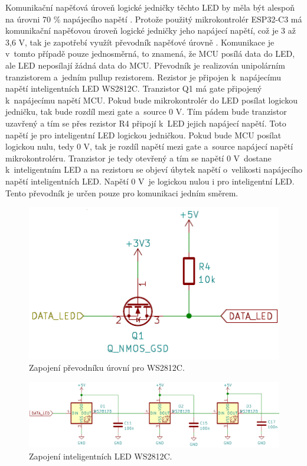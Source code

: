 Komunikační napěťová úroveň logické jedničky těchto LED by měla být alespoň na úrovni 70 \% napájecího napětí \cite{WS2812C_dtsh}. 
Protože použitý mikrokontrolér ESP32-C3 má komunikační napěťovou úroveň logické jedničky jeho napájecí napětí, což je 3 až 3,6 V, 
tak je zapotřebí využít převodník napěťové úrovně \cite{ESP_C3_dtsh}. Komunikace je v~tomto případě pouze jednosměrná, 
to znamená, že MCU posílá data do LED, ale LED neposílají žádná data do MCU. Převodník je realizován unipolárním tranzistorem 
a~jedním pullup rezistorem. Rezistor je připojen k~napájecímu napětí inteligentních LED WS2812C. 
Tranzistor Q1 má gate připojený k~napájecímu napětí MCU. Pokud bude mikrokontrolér do LED posílat logickou jedničku, tak bude rozdíl
mezi gate a~source 0 V. Tím pádem bude tranzistor uzavřený a tím se přes rezistor R4 připojí k~LED jejich napájecí napětí. Toto napětí 
je pro inteligentní LED logickou jedničkou. Pokud bude MCU posílat logickou nulu, tedy 0 V, tak je rozdíl napětí mezi gate a~source 
napájecí napětí mikrokontroléru. Tranzistor je tedy otevřený a tím se napětí 0 V~dostane k~inteligentním LED a na rezistoru se objeví
úbytek napětí o~velikosti napájecího napětí inteligentních LED. Napětí 0 V~je logickou nulou i pro inteligentní LED. Tento převodník
je určen pouze pro komunikaci jedním směrem. 

\begin{figure}[!h]
  \begin{center}
    \includegraphics[scale=0.6]{obrazky/prevodnik_urovni_pro_WS2812C.png}
  \end{center}
  \caption[Zapojení převodníku úrovní pro WS2812C]{Zapojení převodníku úrovní pro WS2812C.}
\end{figure} 

\begin{figure}[!h]
  \begin{center}
    \includegraphics[scale=0.5]{obrazky/WS2812C.png}
  \end{center}
  \caption[Zapojení inteligentních LED WS2812C]{Zapojení inteligentních LED WS2812C.}
\end{figure}

